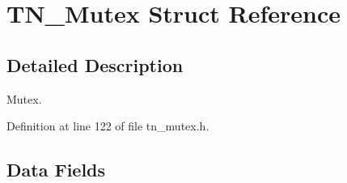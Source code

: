 \hypertarget{structTN__Mutex}{}\section{T\+N\+\_\+\+Mutex Struct Reference}
\label{structTN__Mutex}


\subsection{Detailed Description}
Mutex. 

Definition at line 122 of file tn\+\_\+mutex.\+h.

\subsection*{Data Fields}
